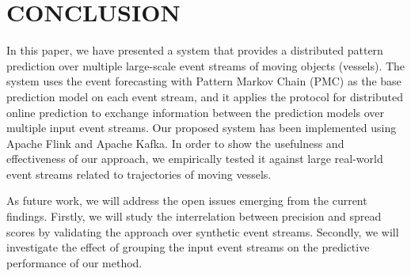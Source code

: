 
\section{CONCLUSION}
\label{sec:concl}
\par In this paper, we have presented a system that provides  a distributed pattern prediction over multiple large-scale event streams of moving objects (vessels). The system uses the event forecasting with Pattern Markov Chain (PMC) \cite{alevizos2017event} as the base prediction model on each event stream, and it applies the protocol for distributed online prediction \cite{kamp2014communication} to exchange information between the prediction models over multiple input event streams. Our proposed system has been implemented using Apache Flink and Apache Kafka. In order to show the usefulness and effectiveness of our approach, we empirically tested it against large real-world event streams related to trajectories of moving vessels.

\par As future work, we will address the open issues emerging from the current findings. Firstly,  we will study the interrelation between precision and spread scores by validating the approach over synthetic event streams. Secondly, we will investigate the effect of grouping the input event streams on the predictive performance of our method.